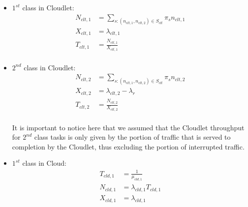 \begin{itemize}
	
	\item $1^{st}$ class in Cloudlet:
	\begin{equation} 
		\begin{split}
			N_{clt,1} &= \sum_{s: (n_{clt,1},n_{clt,2}) \in S_{clt}} \pi_{s} n_{clt,1}  \\
			X_{clt,1} &= \lambda_{clt,1} \\
			T_{clt,1} &= \frac{N_{clt,1}}{X_{clt,1}} \\
		\end{split}
	\end{equation}

	\item $2^{nd}$ class in Cloudlet:
	\begin{equation} 
		\begin{split}
			N_{clt,2} &= \sum_{s: (n_{clt,1},n_{clt,2}) \in S_{clt}} \pi_{s} n_{clt,2}  \\
			X_{clt,2} &= \lambda_{clt,2} - \lambda_{r} \\
			T_{clt,2} &= \frac{N_{clt,2}}{X_{clt,2}} \\
		\end{split}
	\end{equation}

It is important to notice here that we assumed that the Cloudlet throughput for $2^{nd}$ class tasks is only given by the portion of traffic that is served to completion by the Cloudlet, thus excluding the portion of interrupted traffic.

	\item $1^{st}$ class in Cloud:
	\begin{equation} 
		\begin{split}
			T_{cld,1} &= \frac{1}{\mu_{cld,1}} \\
			N_{cld,1} &= \lambda_{cld,1}T_{cld,1} \\
			X_{cld,1} &= \lambda_{cld,1} \\
		\end{split}
	\end{equation}
	

\end{itemize}
